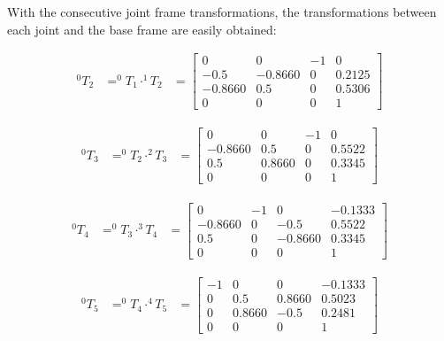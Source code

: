 \documentclass[fleqn]{article}
\begin{document}
With the consecutive joint frame transformations, the transformations between each joint and the base frame are easily obtained:

\begin{equation}
\begin{split}
^{0}T_{2}&=^{0}T_{1}\cdot^{1}T_{2}
&=\begin{bmatrix}
0 & 0 & -1 & 0\\
-0.5 & -0.8660 & 0 & 0.2125\\
-0.8660 & 0.5 & 0 & 0.5306\\
0 & 0 & 0 & 1
\end{bmatrix}
\end{split}
\end{equation}

\begin{equation}
\begin{split}
^{0}T_{3}&=^{0}T_{2}\cdot^{2}T_{3}
&=\begin{bmatrix}
0 & 0 & -1 & 0\\
-0.8660 & 0.5 & 0 & 0.5522\\
0.5 & 0.8660 & 0 & 0.3345\\
0 & 0 & 0 & 1
\end{bmatrix}
\end{split}
\end{equation}

\begin{equation}
\begin{split}
^{0}T_{4}&=^{0}T_{3}\cdot^{3}T_{4}
&=\begin{bmatrix}
0 & -1 & 0 & -0.1333\\
-0.8660 & 0 & -0.5 & 0.5522\\
0.5 & 0 & -0.8660 & 0.3345\\
0 & 0 & 0 & 1
\end{bmatrix}
\end{split}
\end{equation}

\begin{equation}
\begin{split}
^{0}T_{5}&=^{0}T_{4}\cdot^{4}T_{5}
&=\begin{bmatrix}
-1 & 0 & 0 & -0.1333\\
0 & 0.5 & 0.8660 & 0.5023\\
0 & 0.8660 & -0.5 & 0.2481\\
0 & 0 & 0 & 1
\end{bmatrix}
\end{split}
\end{equation}
\end{document}
